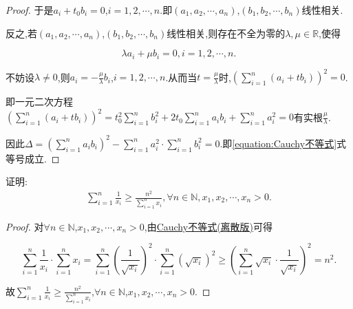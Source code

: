 \documentclass[../../main.tex]{subfiles}%
\begin{document}
\begin{proof}
于是\(a_i + t_0b_i = 0\),\(i = 1,2,\cdots,n\).即\((a_1,a_2,\cdots,a_n)\),\((b_1,b_2,\cdots,b_n)\)线性相关.

反之,若\((a_1,a_2,\cdots,a_n)\),\((b_1,b_2,\cdots,b_n)\)线性相关,则存在不全为零的\(\lambda,\mu \in \mathbb{R}\),使得

\[
\lambda a_i + \mu b_i = 0,  i = 1,2,\cdots,n.
\]

不妨设\(\lambda \neq 0\),则\(a_i = -\frac{\mu}{\lambda}b_i\),\(i = 1,2,\cdots,n\).从而当\(t = \frac{\mu}{\lambda}\)时,\(\left(\sum\limits_{i = 1}^{n}(a_i + tb_i)\right)^2 = 0\).

即一元二次方程\(\left(\sum\limits_{i = 1}^{n}(a_i + tb_i)\right)^2 = t_{0}^{2}\sum\limits_{i = 1}^{n}b_{i}^{2} + 2t_0\sum\limits_{i = 1}^{n}a_ib_i + \sum\limits_{i = 1}^{n}a_{i}^{2} = 0\)有实根\(\frac{\mu}{\lambda}\).

因此\(\Delta = \left(\sum\limits_{i = 1}^{n}a_ib_i\right)^2 - \sum\limits_{i = 1}^{n}a_{i}^{2} \cdot \sum\limits_{i = 1}^{n}b_{i}^{2} = 0\).即\eqref{equation:Cauchy不等式}式等号成立.

\end{proof}

\begin{example}
证明:\begin{align*}
\sum\limits_{i=1}^n{\frac{1}{x_i}}\geqslant \frac{n^2}{\sum\limits_{i=1}^n{x_i}},\forall n\in \mathbb{N} ,x_1,x_2,\cdots ,x_n>0.
\end{align*}
\end{example}
\begin{proof}

对\(\forall n \in \mathbb{N}\),\(x_1,x_2,\cdots,x_n > 0\),由\hyperref[theorem:Cauchy不等式(离散版)]{Cauchy不等式(离散版)}可得

\[
\sum\limits_{i = 1}^{n}\frac{1}{x_i} \cdot \sum\limits_{i = 1}^{n}x_i = \sum\limits_{i = 1}^{n}\left(\frac{1}{\sqrt{x_i}}\right)^2 \cdot \sum\limits_{i = 1}^{n}\left(\sqrt{x_i}\right)^2 \geqslant \left(\sum\limits_{i = 1}^{n}\sqrt{x_i} \cdot \frac{1}{\sqrt{x_i}}\right)^2 = n^2.
\]

故\(\sum\limits_{i = 1}^{n}\frac{1}{x_i} \geqslant \frac{n^2}{\sum\limits_{i = 1}^{n}x_i}\),\(\forall n \in \mathbb{N}\),\(x_1,x_2,\cdots,x_n > 0\). 

\end{proof}
\end{document}
